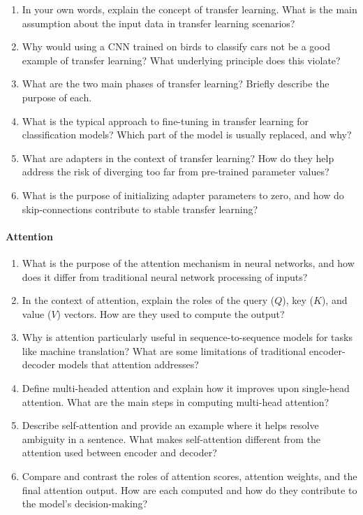 \begin{enumerate}
    \item In your own words, explain the concept of transfer learning. What is the main assumption about the input data in transfer learning scenarios?

    \item Why would using a CNN trained on birds to classify cars not be a good example of transfer learning? What underlying principle does this violate?

    \item What are the two main phases of transfer learning? Briefly describe the purpose of each.

    \item What is the typical approach to fine-tuning in transfer learning for classification models? Which part of the model is usually replaced, and why?

    \item What are adapters in the context of transfer learning? How do they help address the risk of diverging too far from pre-trained parameter values?

    \item What is the purpose of initializing adapter parameters to zero, and how do skip-connections contribute to stable transfer learning?
\end{enumerate}

\paragraph*{Attention}

\begin{enumerate}
    \item What is the purpose of the attention mechanism in neural networks, and how does it differ from traditional neural network processing of inputs?

    \item In the context of attention, explain the roles of the query ($Q$), key ($K$), and value ($V$) vectors. How are they used to compute the output?

    \item Why is attention particularly useful in sequence-to-sequence models for tasks like machine translation? What are some limitations of traditional encoder-decoder models that attention addresses?

    \item Define multi-headed attention and explain how it improves upon single-head attention. What are the main steps in computing multi-head attention?

    \item Describe self-attention and provide an example where it helps resolve ambiguity in a sentence. What makes self-attention different from the attention used between encoder and decoder?

    \item Compare and contrast the roles of attention scores, attention weights, and the final attention output. How are each computed and how do they contribute to the model's decision-making?
\end{enumerate}

